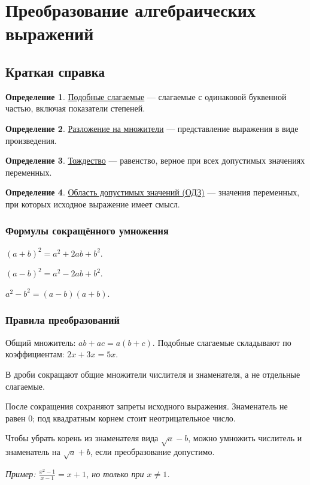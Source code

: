 \documentclass[12pt,a4paper]{article}
\theoremstyle{definition}
\newtheorem{definition}{Определение}[section]
\theoremstyle{plain}
\theoremstyle{remark}
\newcommand{\term}[1]{\uline{#1}}
\begin{document}
\section{Преобразование алгебраических выражений}
\subsection*{Краткая справка}
\begin{definition}\term{Подобные слагаемые} — слагаемые с одинаковой буквенной частью, включая показатели степеней.\end{definition}
\begin{definition}\term{Разложение на множители} — представление выражения в виде произведения.\end{definition}
\begin{definition}\term{Тождество} — равенство, верное при всех допустимых значениях переменных.\end{definition}
\begin{definition}\term{Область допустимых значений (ОДЗ)} — значения переменных, при которых исходное выражение имеет смысл.\end{definition}
\subsubsection*{Формулы сокращённого умножения}
\((a + b)^{2} = a^{2} + 2 ab + b^{2}\).\par
\((a - b)^{2} = a^{2} - 2 ab + b^{2}\).\par
\(a^{2} - b^{2} = (a - b) (a + b)\).\par
\subsubsection*{Правила преобразований}
Общий множитель: \(ab + ac = a (b + c)\). Подобные слагаемые складывают по коэффициентам: \(2 x + 3 x = 5 x\).\par
В дроби сокращают общие множители числителя и знаменателя, а не отдельные слагаемые.\par
После сокращения сохраняют запреты исходного выражения. Знаменатель не равен \(0\); под квадратным корнем стоит неотрицательное число.\par
Чтобы убрать корень из знаменателя вида \(\sqrt{a} - b\), можно умножить числитель и знаменатель на \(\sqrt{a} + b\), если преобразование допустимо.\par
{\small\textit{Пример: \(\frac{x^{2} - 1}{x - 1} = x + 1\), но только при \(x \ne  1\).}}\par
\end{document}
